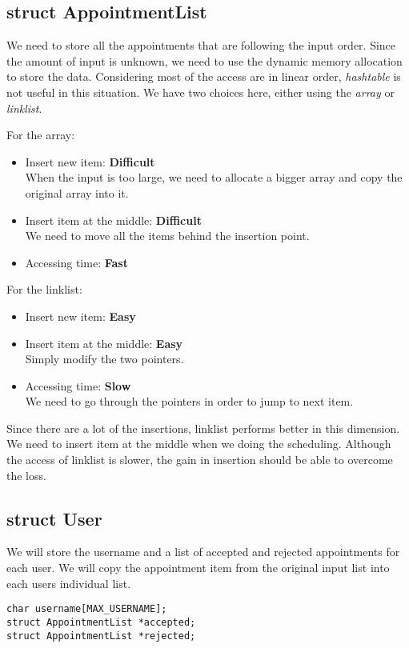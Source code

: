 \documentclass[12pt,a4paper]{report}
\begin{document}
\subsection{struct AppointmentList}
We need to store all the appointments that are following the input order. Since the amount of input is unknown, we need to use the dynamic memory allocation to store the data. Considering most of the access are in linear order, \textit{hashtable} is not useful in this situation. We have two choices here, either using the \textit{array} or \textit{linklist}.

For the array:
\begin{itemize}
\item Insert new item: \textbf{Difficult} \\ When the input is too large, we need to allocate a bigger array and copy the original array into it.
\item Insert item at the middle: \textbf{Difficult} \\ We need to move all the items behind the insertion point.
\item Accessing time: \textbf{Fast}
\end{itemize}

For the linklist:
\begin{itemize}
\item Insert new item: \textbf{Easy}
\item Insert item at the middle: \textbf{Easy} \\ Simply modify the two pointers.
\item Accessing time: \textbf{Slow} \\ We need to go through the pointers in order to jump to next item.
\end{itemize}

Since there are a lot of the insertions, linklist performs better in this dimension. We need to insert item at the middle when we doing the scheduling. Although the access of linklist is slower, the gain in insertion should be able to overcome the loss.
\subsection{struct User}
We will store the username and a list of accepted and rejected appointments for each user. We will copy the appointment item from the original input list into each users individual list. 
\begin{lstlisting}
char username[MAX_USERNAME];
struct AppointmentList *accepted;
struct AppointmentList *rejected;
\end{lstlisting}
\end{document}
